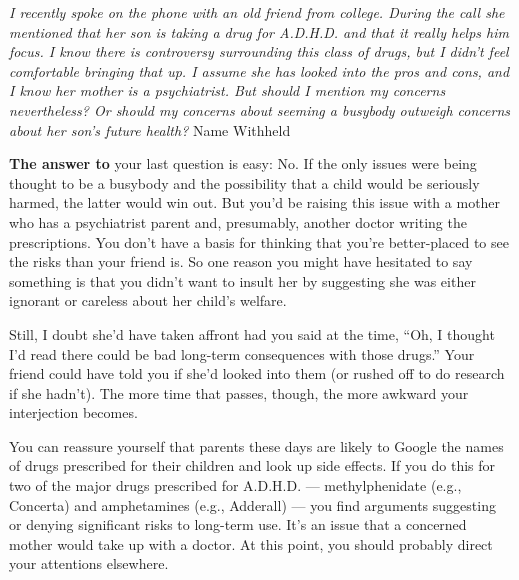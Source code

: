 \emph{I recently spoke on the phone with an old friend from college.
During the call she mentioned that her son is taking a drug for A.D.H.D.
and that it really helps him focus. I know there is controversy
surrounding this class of drugs, but I didn't feel comfortable bringing
that up. I assume she has looked into the pros and cons, and I know her
mother is a psychiatrist. But should I mention my concerns nevertheless?
Or should my concerns about seeming a busybody outweigh concerns about
her son's future health?} Name Withheld

\textbf{The answer to} your last question is easy: No. If the only
issues were being thought to be a busybody and the possibility that a
child would be seriously harmed, the latter would win out. But you'd be
raising this issue with a mother who has a psychiatrist parent and,
presumably, another doctor writing the prescriptions. You don't have a
basis for thinking that you're better-placed to see the risks than your
friend is. So one reason you might have hesitated to say something is
that you didn't want to insult her by suggesting she was either ignorant
or careless about her child's welfare.

Still, I doubt she'd have taken affront had you said at the time, ``Oh,
I thought I'd read there could be bad long-term consequences with those
drugs.'' Your friend could have told you if she'd looked into them (or
rushed off to do research if she hadn't). The more time that passes,
though, the more awkward your interjection becomes.

You can reassure yourself that parents these days are likely to Google
the names of drugs prescribed for their children and look up side
effects. If you do this for two of the major drugs prescribed for
A.D.H.D. --- methylphenidate (e.g., Concerta) and amphetamines (e.g.,
Adderall) --- you find arguments suggesting or denying significant risks
to long-term use. It's an issue that a concerned mother would take up
with a doctor. At this point, you should probably direct your attentions
elsewhere.

